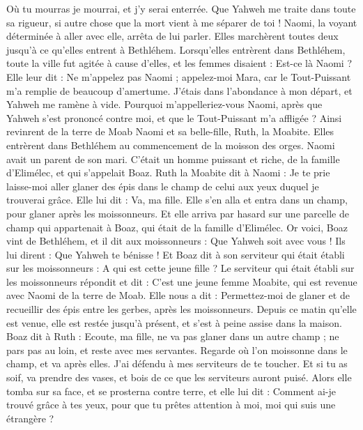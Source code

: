 \begin{multicols}{2}
Où tu mourras je mourrai, et j'y serai enterrée. Que Yahweh me traite dans toute sa rigueur, si autre chose que la mort vient à me séparer de toi !
Naomi, la voyant déterminée à aller avec elle, arrêta de lui parler.
Elles marchèrent toutes deux jusqu'à ce qu'elles entrent à Bethléhem. Lorsqu'elles entrèrent dans Bethléhem, toute la ville fut agitée à cause d'elles, et les femmes disaient : Est-ce là Naomi ?
Elle leur dit : Ne m'appelez pas Naomi ; appelez-moi Mara, car le Tout-Puissant m'a remplie de beaucoup d'amertume.
J’étais dans l'abondance à mon départ, et Yahweh me ramène à vide. Pourquoi m'appelleriez-vous Naomi, après que Yahweh s'est prononcé contre moi, et que le Tout-Puissant m'a affligée ?
Ainsi revinrent de la terre de Moab Naomi et sa belle-fille, Ruth, la Moabite. Elles entrèrent dans Bethléhem au commencement de la moisson des orges.
\VerseOne{}Naomi avait un parent de son mari. C'était un homme puissant et riche, de la famille d'Elimélec, et qui s’appelait Boaz.
Ruth la Moabite dit à Naomi : Je te prie laisse-moi aller glaner des épis dans le champ de celui aux yeux duquel je trouverai grâce. Elle lui dit : Va, ma fille.
Elle s'en alla et entra dans un champ, pour glaner après les moissonneurs. Et elle arriva par hasard sur une parcelle de champ qui appartenait à Boaz, qui était de la famille d'Elimélec.
Or voici, Boaz vint de Bethléhem, et il dit aux moissonneurs : Que Yahweh soit avec vous ! Ils lui dirent : Que Yahweh te bénisse !
Et Boaz dit à son serviteur qui était établi sur les moissonneurs : A qui est cette jeune fille ?
Le serviteur qui était établi sur les moissonneurs répondit et dit : C'est une jeune femme Moabite, qui est revenue avec Naomi de la terre de Moab.
Elle nous a dit : Permettez-moi de glaner et de recueillir des épis entre les gerbes, après les moissonneurs. Depuis ce matin qu'elle est venue, elle est restée jusqu'à présent, et s'est à peine assise dans la maison.
Boaz dit à Ruth : Ecoute, ma fille, ne va pas glaner dans un autre champ ; ne pars pas au loin, et reste avec mes servantes.
Regarde où l'on moissonne dans le champ, et va après elles. J'ai défendu à mes serviteurs de te toucher. Et si tu as soif, va prendre des vases, et bois de ce que les serviteurs auront puisé.
Alors elle tomba sur sa face, et se prosterna contre terre, et elle lui dit : Comment ai-je trouvé grâce à tes yeux, pour que tu prêtes attention à moi, moi qui suis une étrangère ?

\end{multicols}
